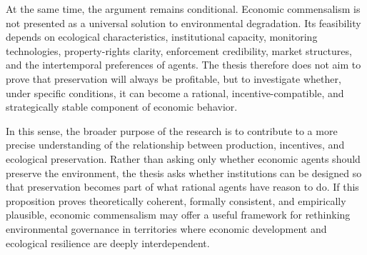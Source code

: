 At the same time, the argument remains conditional. Economic commensalism is not presented as a universal solution to environmental degradation. Its feasibility depends on ecological characteristics, institutional capacity, monitoring technologies, property-rights clarity, enforcement credibility, market structures, and the intertemporal preferences of agents. The thesis therefore does not aim to prove that preservation will always be profitable, but to investigate whether, under specific conditions, it can become a rational, incentive-compatible, and strategically stable component of economic behavior.

In this sense, the broader purpose of the research is to contribute to a more precise understanding of the relationship between production, incentives, and ecological preservation. Rather than asking only whether economic agents should preserve the environment, the thesis asks whether institutions can be designed so that preservation becomes part of what rational agents have reason to do. If this proposition proves theoretically coherent, formally consistent, and empirically plausible, economic commensalism may offer a useful framework for rethinking environmental governance in territories where economic development and ecological resilience are deeply interdependent.

\newpage

